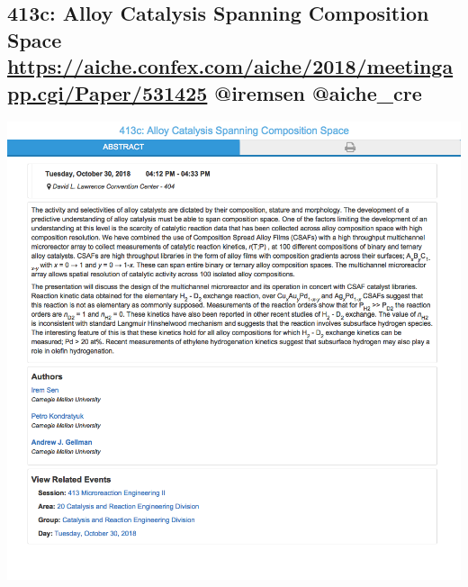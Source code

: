\documentclass[11pt]{article}
\begin{document}
\subsection{413c: Alloy Catalysis Spanning Composition Space \url{https://aiche.confex.com/aiche/2018/meetingapp.cgi/Paper/531425} @iremsen @aiche\_cre}
\label{sec:org82f194f}
\begin{center}
\includegraphics[width=.9\linewidth]{./531425.png}
\end{center}
\end{document}
